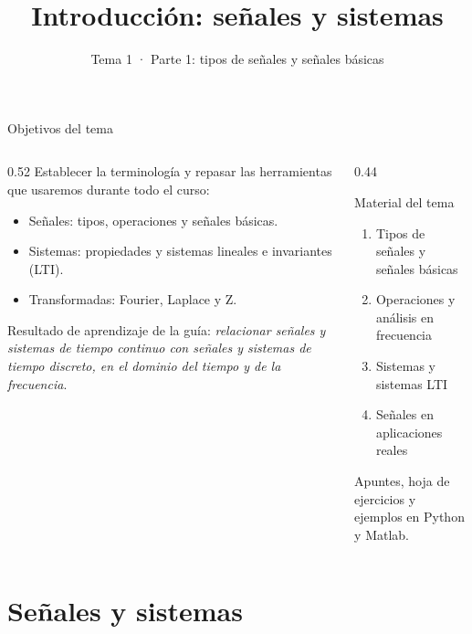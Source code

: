 \documentclass[aspectratio=169,11pt]{beamer}
\title[T1 · Señales]{Introducción: señales y sistemas}
\subtitle{Tema 1 · Parte 1: tipos de señales y señales básicas}
\begin{document}
\portada

\begin{frame}{Objetivos del tema}
  \begin{columns}[T]
    \begin{column}{0.52\textwidth}
      Establecer la terminología y repasar las herramientas que usaremos durante todo el curso:
      \begin{itemize}
        \item \alert{Señales}: tipos, operaciones y señales básicas.
        \item \alert{Sistemas}: propiedades y sistemas lineales e invariantes (LTI).
        \item \alert{Transformadas}: Fourier, Laplace y Z.
      \end{itemize}
      \medskip
      {\small Resultado de aprendizaje de la guía: \emph{relacionar señales y sistemas de tiempo continuo con señales y sistemas de tiempo discreto, en el dominio del tiempo y de la frecuencia}.}
    \end{column}
    \begin{column}{0.44\textwidth}
      \begin{block}{Material del tema}
        \small
        \begin{enumerate}
          \item Tipos de señales y señales básicas
          \item Operaciones y análisis en frecuencia
          \item Sistemas y sistemas LTI
          \item Señales en aplicaciones reales
        \end{enumerate}
        \smallskip
        Apuntes, hoja de ejercicios y ejemplos en Python y Matlab.
      \end{block}
    \end{column}
  \end{columns}
\end{frame}

\section{Señales y sistemas}
\end{document}

